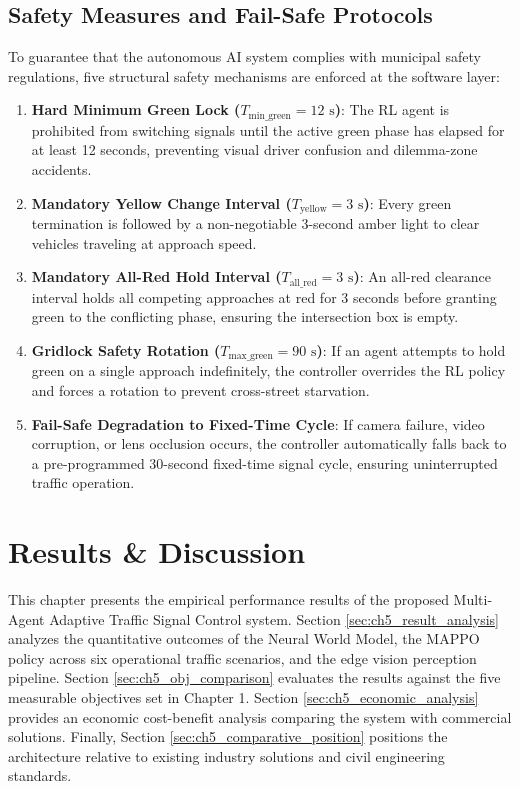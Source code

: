 \documentclass[12pt,a4paper,oneside]{report}
\begin{document}
\section{Safety Measures and Fail-Safe Protocols}
\label{sec:ch4_safety_measures}
To guarantee that the autonomous AI system complies with municipal safety regulations, five structural safety mechanisms are enforced at the software layer:
\begin{enumerate}
    \item \textbf{Hard Minimum Green Lock ($T_{\text{min\_green}} = 12\text{ s}$)}: The RL agent is prohibited from switching signals until the active green phase has elapsed for at least 12 seconds, preventing visual driver confusion and dilemma-zone accidents.
    \item \textbf{Mandatory Yellow Change Interval ($T_{\text{yellow}} = 3\text{ s}$)}: Every green termination is followed by a non-negotiable 3-second amber light to clear vehicles traveling at approach speed.
    \item \textbf{Mandatory All-Red Hold Interval ($T_{\text{all\_red}} = 3\text{ s}$)}: An all-red clearance interval holds all competing approaches at red for 3 seconds before granting green to the conflicting phase, ensuring the intersection box is empty.
    \item \textbf{Gridlock Safety Rotation ($T_{\text{max\_green}} = 90\text{ s}$)}: If an agent attempts to hold green on a single approach indefinitely, the controller overrides the RL policy and forces a rotation to prevent cross-street starvation.
    \item \textbf{Fail-Safe Degradation to Fixed-Time Cycle}: If camera failure, video corruption, or lens occlusion occurs, the controller automatically falls back to a pre-programmed 30-second fixed-time signal cycle, ensuring uninterrupted traffic operation.
\end{enumerate}

\chapter{Results \& Discussion}
\label{ch:results_discussion}

This chapter presents the empirical performance results of the proposed Multi-Agent Adaptive Traffic Signal Control system. Section \ref{sec:ch5_result_analysis} analyzes the quantitative outcomes of the Neural World Model, the MAPPO policy across six operational traffic scenarios, and the edge vision perception pipeline. Section \ref{sec:ch5_obj_comparison} evaluates the results against the five measurable objectives set in Chapter 1. Section \ref{sec:ch5_economic_analysis} provides an economic cost-benefit analysis comparing the system with commercial solutions. Finally, Section \ref{sec:ch5_comparative_position} positions the architecture relative to existing industry solutions and civil engineering standards.
\end{document}
